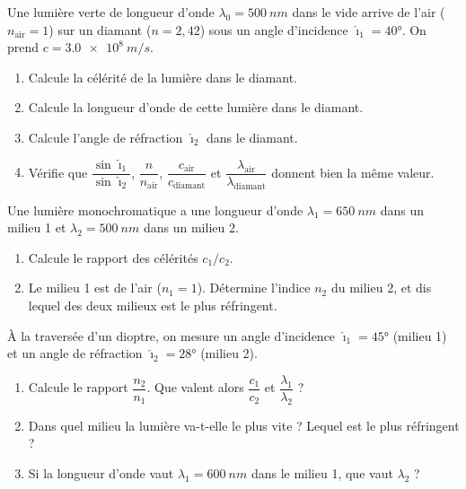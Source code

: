 \documentclass[11pt,a4paper]{article}
\begin{document}
\begin{exo}
Une lumière verte de longueur d'onde $\lambda_0=\qty{500}{nm}$ dans le vide arrive de l'air
($n_{\text{air}}=1$) sur un diamant ($n=2{,}42$) sous un angle d'incidence $\hat{\imath}_1=\ang{40}$.
On prend $c=\qty{3.0e8}{m/s}$.
\begin{enumerate}[label=\alph*)]
  \item Calcule la célérité de la lumière dans le diamant.
  \item Calcule la longueur d'onde de cette lumière dans le diamant.
  \item Calcule l'angle de réfraction $\hat{\imath}_2$ dans le diamant.
  \item Vérifie que $\dfrac{\sin\hat{\imath}_1}{\sin\hat{\imath}_2}$, $\dfrac{n}{n_{\text{air}}}$,
        $\dfrac{c_{\text{air}}}{c_{\text{diamant}}}$ et $\dfrac{\lambda_{\text{air}}}{\lambda_{\text{diamant}}}$
        donnent bien la même valeur.
\end{enumerate}
\end{exo}

\begin{exo}
Une lumière monochromatique a une longueur d'onde $\lambda_1=\qty{650}{nm}$ dans un milieu 1 et
$\lambda_2=\qty{500}{nm}$ dans un milieu 2.
\begin{enumerate}[label=\alph*)]
  \item Calcule le rapport des célérités $c_1/c_2$.
  \item Le milieu 1 est de l'air ($n_1=1$). Détermine l'indice $n_2$ du milieu 2, et dis lequel des
        deux milieux est le plus réfringent.
\end{enumerate}
\end{exo}

\begin{exo}
À la traversée d'un dioptre, on mesure un angle d'incidence $\hat{\imath}_1=\ang{45}$ (milieu 1) et
un angle de réfraction $\hat{\imath}_2=\ang{28}$ (milieu 2).
\begin{enumerate}[label=\alph*)]
  \item Calcule le rapport $\dfrac{n_2}{n_1}$. Que valent alors $\dfrac{c_1}{c_2}$ et
        $\dfrac{\lambda_1}{\lambda_2}$ ?
  \item Dans quel milieu la lumière va-t-elle le plus vite ? Lequel est le plus réfringent ?
  \item Si la longueur d'onde vaut $\lambda_1=\qty{600}{nm}$ dans le milieu 1, que vaut $\lambda_2$ ?
\end{enumerate}
\end{exo}
\end{document}
